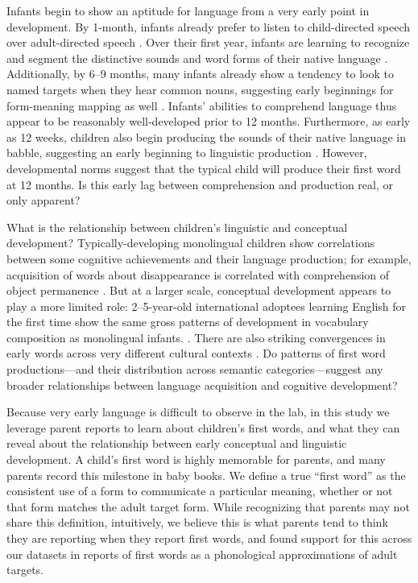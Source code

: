 \documentclass[10pt,letterpaper]{article}
\begin{document}
Infants begin to show an aptitude for language from a very early point in development. By 1-month, infants already prefer to listen to child-directed speech over adult-directed speech \cite{cooper1990}. Over their first year, infants are learning to recognize and segment the distinctive sounds and word forms of their native language \cite{kuhl2004,werker2005}. Additionally, by 6--9 months, many infants already show a tendency to look to named targets when they hear common nouns, suggesting early beginnings for form-meaning mapping as well \cite{tincoff2012,bergelson2012}. Infants' abilities to comprehend language thus appear to be reasonably well-developed prior to 12 months. Furthermore, as early as 12 weeks, children also begin producing the sounds of their native language in babble, suggesting an early beginning to linguistic production \cite{kuhl2004}. However, developmental norms suggest that the typical child will produce their first word at 12 months. Is this early lag between comprehension and production real, or only apparent?

What is the relationship between children's linguistic and conceptual development? Typically-developing monolingual children show correlations between some cognitive achievements and their language production; for example, acquisition of words about disappearance is correlated with comprehension of object permanence \cite{gopnik1986}. But at a larger scale, conceptual development appears to play a more limited role: 2--5-year-old international adoptees learning English for the first time show the same gross patterns of development in vocabulary composition as monolingual infants. \cite{snedeker2007}. There are also striking convergences in early words across very different cultural contexts \cite{tardif2007}. Do patterns of first word productions---and their distribution across semantic categories---suggest any broader relationships between language acquisition and cognitive development? 

Because very early language is difficult to observe in the lab, in this study we leverage parent reports to learn about children's first words, and what they can reveal about the relationship between early conceptual and linguistic development. A child's first word is highly memorable for parents, and many parents record this milestone in baby books. We define a true ``first word'' as the consistent use of a form to communicate a particular meaning, whether or not that form matches the adult target form. While recognizing that parents may not share this definition, intuitively, we believe this is what parents tend to think they are reporting when they report first words, and found support for this across our datasets in reports of first words as a phonological approximations of adult targets.
\end{document}
